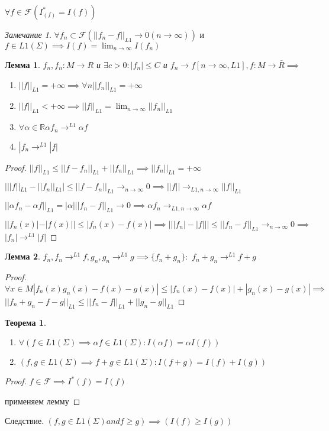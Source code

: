 \documentclass[a4paper]{article}
\newtheorem{theorem}{Теорема}[section]
\newtheorem{lemma}{Лемма}[section]
\theoremstyle{definition}
\theoremstyle{remark}
\newtheorem*{remark}{Замечание}
\begin{document}
     $\forall f\in\mathcal{F} (I^*_(f) = I(f))$

     \begin{remark}
     $\forall f_n \subset \mathcal{F}  (||f_n - f||_{L1}\to 0 (n\to\infty))$ и $f\in L1(\Sigma)\implies I(f) = \lim_{n\to\infty} I(f_n)$
     \end{remark}
     \begin{lemma}
          $f_n, f_n: M\to R$ и $\exists c>0 : |f_n|\leq C$ и $f_n\to f [n\to \infty , L1], f: M\to \bar{R}\implies$
          \begin{enumerate}
               \item $||f||_{L1} = +\infty \implies \forall n ||f_n||_{L1} = +\infty$
               \item $||f||_{L1}< +\infty\implies ||f||_{L1} = \lim_{n\to\infty}||f_n||_{L1}$
               \item $\forall \alpha \in \mathbb{R} \alpha f_n\to^{L1} \alpha f$
               \item $|f_n\to^{L1} |f|$
          \end{enumerate}
     \end{lemma}
     \begin{proof}
          $||f||_{L1}\leq ||f-f_n||_{L1} + ||f_n||_{L1}\implies ||f_n||_{L1} = +\infty$

          $|||f||_{L1} - ||f_n||_{L1}|\leq ||f-f_n||_{L1}\to_{n\to \infty} 0\implies ||f||\to_{L1, n\to\infty} ||f||_{L1}$

          $||\alpha f_n - \alpha f||_{L1} = |\alpha| ||f_n - f||_{L1}\to 0 \implies \alpha f_n \to_{L1, n\to \infty} \alpha f$

          $||f_n(x)| - |f(x)||\leq|f_n(x) - f(x)|\implies|||f_n| - |f|||\leq ||f_n - f||_{L1}\to_{n\to \infty} 0 \implies$
          $|f_n| \to^{L1} |f|$
     \end{proof}
     \begin{lemma}
          $f_n, f_n\to^{L1} f, g_n, g_n\to^{L1} g \implies \{f_n+g_n\}:$
          $f_n+g_n\to^{L1} f+g$
     \end{lemma}
     \begin{proof}
          $\forall x\in M |f_n(x) g_n(x) - f(x) - g(x)|\leq |f_n(x) - f(x)| + |g_n(x) - g(x)|\implies$
          $||f_n+g_n - f - g||_{L1}\leq ||f_n - f||_{L1} + ||g_n - g||_{L1}$
     \end{proof}
\begin{theorem}
     \begin{enumerate}
          \item $\forall (f\in L1(\Sigma)\implies \alpha f\in L1(\Sigma): I(\alpha f) = \alpha I(f))$
          \item $(f, g \in L1(\Sigma)\implies f+g\in L1(\Sigma): I(f+g) = I(f)+ I(g))$
     \end{enumerate}
\end{theorem}
\begin{proof}
     $f\in \mathcal{F} \implies I^*(f) = I(f)$

     применяем лемму
\end{proof}
Следствие.
     $(f, g\in L1(\Sigma)and f\geq g)\implies(I(f)\geq I(g))$
\end{document}
